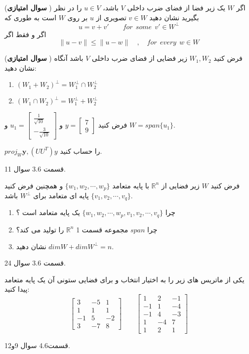 \documentclass{article}
\begin{document}
	
	({\bf سوال امتیازی })
	اگر 
	$W$
	یک زیر فضا از فضای ضرب داخلی 
	$V$
	باشد،
	$u\in V$
	را در نظر بگیرید نشان دهید
	$v\in W$
	تصویری از 
	$u$
	بر روی 
	$W$
	است به طوری که   
	$$u=v+v'\qquad for\  \ some\ \ v' \in W^{\perp}$$
	اگر و فقط اگر 
	$$\parallel u-v\parallel \leq \parallel u-w\parallel\quad,\quad for \ \ every \ \ w\in W $$
	
	
	({\bf سوال امتیازی }) فرض کنید 
	$W_1,W_2$
	زیر فضایی از فضای ضرب داخلی 
	$V$
	باشد آنگاه نشان دهید:
	\begin{enumerate}
		\item $(W_1+W_2)^{\perp}=W_1^{\perp}\cap W_2^{\perp}$
		\item $(W_1\cap W_2)^{\perp}=W_1^{\perp}+W_2^{\perp}$
	\end{enumerate}
	
	
	
	 فرض کنید 
	$y=\begin{bmatrix}
	7\\
	9
	\end{bmatrix}$
	و 
	$u_1=\begin{bmatrix}
	\frac{1}{\sqrt{10}}\\
	-\frac{3}{\sqrt{10}}
	\end{bmatrix}$
	و 
	$W=span\{u_1\}$.
	
	
	$proj_W \boldsymbol{y},(UU^T)y$
	را حساب کنید.
	\begin{حل}
		قسمت 3.6 سوال 11.
	\end{حل}
	
	 فرض کنید 
	$W$
	زیر فضایی از 
	$\mathbb{R}^n$
	با پایه متعامد 
	$\{w_1,w_2,\cdots,w_p\}$
	و همچنین فرض کنید 
	$\{v_1,v_2,\cdots,v_q\}$
	پایه ای متعامد برای 
	$W^{\perp}$
	باشد.
	\begin{enumerate}
		\item 
		چرا 
		$\{w_1,w_2,\cdots,w_p,v_1,v_2,\cdots,v_q\}$
		یک پایه متعامد است ؟
		\item 
		چرا 
		$span$
		مجموعه قسمت 1
		$\mathbb{R}^n$
		را تولید می کند؟
		\item 
		نشان دهید
		$dim W+dim W^{\perp}=n$.
		
		
	\end{enumerate}
	\begin{حل}
		قسمت 3.6 سوال 24.
	\end{حل}
	
	یکی از ماتریس های زیر را به اختیار انتخاب و برای فضایی ستونی آن یک پایه متعامد پیدا کنید:
	$$\begin{bmatrix}
	3&-5&1\\
	1&1&1\\
	-1&5&-2\\
	3&-7&8
	\end{bmatrix} \qquad
	\begin{bmatrix}
	1&2&-1\\
	-1&1&-4\\
	-1&4&-3\\
	1&-4&7\\
	1&2&1
	\end{bmatrix}
	$$
	\begin{حل}
		قسمت4.6 سوال 9و12. 
	\end{حل}
	
\end{document}
